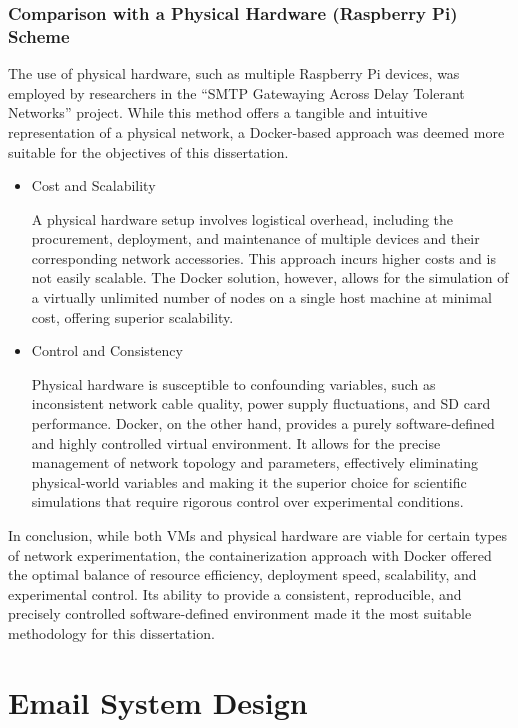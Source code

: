 \subsubsection*{Comparison with a Physical Hardware (Raspberry Pi) Scheme}
The use of physical hardware, such as multiple Raspberry Pi devices, was employed by researchers in the ``SMTP Gatewaying Across Delay Tolerant Networks'' project. While this method offers a tangible and intuitive representation of a physical network, a Docker-based approach was deemed more suitable for the objectives of this dissertation.

\begin{itemize}
    \item Cost and Scalability
    
    A physical hardware setup involves logistical overhead, including the procurement, deployment, and maintenance of multiple devices and their corresponding network accessories. This approach incurs higher costs and is not easily scalable. The Docker solution, however, allows for the simulation of a virtually unlimited number of nodes on a single host machine at minimal cost, offering superior scalability.
    \item Control and Consistency
    
    Physical hardware is susceptible to confounding variables, such as inconsistent network cable quality, power supply fluctuations, and SD card performance. Docker, on the other hand, provides a purely software-defined and highly controlled virtual environment. It allows for the precise management of network topology and parameters, effectively eliminating physical-world variables and making it the superior choice for scientific simulations that require rigorous control over experimental conditions.
\end{itemize}

In conclusion, while both VMs and physical hardware are viable for certain types of network experimentation, the containerization approach with Docker offered the optimal balance of resource efficiency, deployment speed, scalability, and experimental control. Its ability to provide a consistent, reproducible, and precisely controlled software-defined environment made it the most suitable methodology for this dissertation.

\section{Email System Design}

